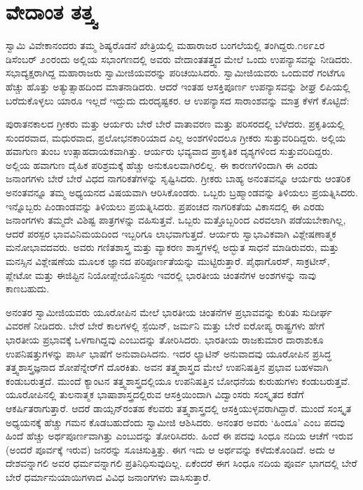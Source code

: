 
\chapter{ವೇದಾಂತ ತತ್ತ್ವ}

ಸ್ವಾಮಿ ವಿವೇಕಾನಂದರು ತಮ್ಮ ಶಿಷ್ಯರೊಡನೆ ಖೇತ್ರಿಯಲ್ಲಿ ಮಹಾರಾಜರ ಬಂಗಲೆಯಲ್ಲಿ ತಂಗಿದ್ದರು.೧೮೯೭ರ ಡಿಸೆಂಬರ್​ ೨೦ರಂದು ಅಲ್ಲಿಯ ಸಭಾಂಗಣದಲ್ಲಿ ಅವರು ವೇದಾಂತತತ್ತ್ವದ ಮೇಲೆ ಒಂದು ಉಪನ್ಯಾಸವನ್ನು ನೀಡಿದರು. ಸಭಾದ್ಯಕ್ಷರಾಗಿದ್ದ ಮಹಾರಾಜರು ಸ್ವಾಮೀಜಿಯವರನ್ನು ಪರಿಚಯಿಸಿದರು. ಸ್ವಾಮೀಜಿಯವರು ಒಂದುವರೆ ಗಂಟೆಗೂ ಹೆಚ್ಚು ಹೊತ್ತು ಅತ್ಯುತ್ಸಾಹದಿಂದ ಮಾತನಾಡಿದರು. ಆದರೆ ಇಂತಹ ಆಸಕ್ತಿಪೂರ್ಣ ಉಪನ್ಯಾಸವನ್ನು ಶೀಘ್ರ ಲಿಪಿಯಲ್ಲಿ ಬರೆದುಕೊಳ್ಳಲು ಯಾರೂ ಇಲ್ಲದೆ ಇದ್ದುದು ದುರದೃಷ್ಟಕರ. ಆ ಉಪನ್ಯಾಸದ ಸಾರಾಂಶವನ್ನು ಮಾತ್ರ ಕೆಳಗೆ ಕೊಟ್ಟಿದೆ:

ಪುರಾತನಕಾಲದ ಗ್ರೀಕರು ಮತ್ತು ಆರ್ಯರು ಬೇರೆ ಬೇರೆ ವಾತಾವರಣ ಮತ್ತು ಪರಿಸರದಲ್ಲಿ ಬೆಳೆದರು. ಪ್ರಕೃತಿಯಲ್ಲಿ ಸುಂದರವಾದ, ಮಧುರವಾದ, ಪ್ರಲೋಭನಕಾರಿಯಾದ ಎಲ್ಲ ಅಂಶಗಳಿಂದಲೂ ಗ್ರೀಕರು ಸುತ್ತುವರಿದಿದ್ದರು. ಅಲ್ಲಿಯ ಹವಾಗುಣ ತುಂಬ ಉತ್ಸಾಹದಾಯಕವಾಗಿತ್ತು. ಆರ್ಯರು ಭವ್ಯವಾದ ಪ್ರಾಕೃತಿಕ ದೃಶ್ಯಗಳಿಂದ ಸುತ್ತುವರಿದಿದ್ದರು. ಅಲ್ಲಿಯ ಹವಾಗುಣ ದೈಹಿಕ ಪರಿಶ್ರಮಕ್ಕೆ ಹೆಚ್ಚು ಅನುಕೂಲವಾಗಿರಲಿಲ್ಲ. ಈ ಕಾರಣಗಳಿಂದಾಗಿ ಈ ಎರಡು ಜನಾಂಗಗಳು ಬೇರೆ ಬೇರೆ ವಿಧದ ನಾಗರಿಕತೆಗಳನ್ನು ಸೃಷ್ಟಿಸಿದರು. ಗ್ರೀಕರು ಬಾಹ್ಯ ಅನಂತವನ್ನೂ ಆರ್ಯರು ಆಂತರಿಕ ಅನಂತವನ್ನೂ ತಮ್ಮ ಅಧ್ಯಯನದ ವಿಷಯವಾಗಿ ಆರಿಸಿಕೊಂಡರು. ಒಬ್ಬರು ಬ್ರಹ್ಮಾಂಡವನ್ನು ತಿಳಿಯಲು ಪ್ರಯತ್ನಿಸಿದರು. ಇನ್ನೊಬ್ಬರು ಪಿಂಡಾಂಡವನ್ನು ತಿಳಿಯಲು ಪ್ರಯತ್ನಿಸಿದರು. ಪ್ರಪಂಚದ ನಾಗರಿಕತೆಯ ವಿಕಾಸದಲ್ಲಿ ಈ ಎರಡು ಜನಾಂಗಗಳು ತಮ್ಮದೇ ವಿಶಿಷ್ಟ ಪಾತ್ರಗಳನ್ನು ವಹಿಸುತ್ತವೆ. ಒಬ್ಬರು ಮತ್ತೊಬ್ಬರಿಂದ ಎರವಲಾಗಿ ಪಡೆಯಬೇಕಾಗಿಲ್ಲ, ಆದರೆ ಪರಸ್ಪರ ಭಾವವಿನಿಮಯದಿಂದ ಇಬ್ಬರಿಗೂ ಲಾಭವಾಗುತ್ತದೆ. ಆರ್ಯರು ಸ್ವಾಭಾವಿಕವಾಗಿ ವಿಶ್ಲೇಷಣಾತ್ಮಕ ಮನೋಭಾವದವರು. ಅವರು ಗಣಿತಶಾಸ್ತ್ರ ಮತ್ತು ವ್ಯಾಕರಣ ಶಾಸ್ತ್ರಗಳಲ್ಲಿ ಅದ್ಭುತ ಸಾಧನೆ ಮಾಡಿರುವರು, ಮತ್ತು ಮನಸ್ಸಿನ ವಿಶ್ಲೇಷಣೆಯ ಮೂಲಕ ಜ್ಞಾನದ ಪರಿಪೂರ್ಣತೆಯನ್ನು ಮುಟ್ಟಿರುತ್ತಾರೆ. ಪೈಥಾಗೊರಸ್​, ಸಾಕ್ರಟೀಸ್​, ಪ್ಲೇಟೋ ಮತ್ತು ಈಜಿಪ್ಟಿನ ನಿಯೋಪ್ಲೇಯೊನಿಸ್ಟರು ಇವರಲ್ಲಿ ಭಾರತೀಯ ಚಿಂತನೆಗಳ ಅಂಶಗಳನ್ನು ನಾವು ಕಾಣಬಹುದು. 

ಅನಂತರ ಸ್ವಾಮೀಜಿಯವರು ಯೂರೋಪಿನ ಮೇಲೆ ಭಾರತೀಯ ಚಿಂತನೆಗಳ ಪ್ರಭಾವವನ್ನು ಕುರಿತು ಸುದೀರ್ಘ ವಿವರಣೆ ನೀಡಿದರು. ಬೇರೆ ಬೇರೆ ಕಾಲಗಳಲ್ಲಿ ಸ್ಪೆಯಿನ್​, ಜರ್ಮನಿ ಮತ್ತು ಬೇರೆ ಐರೋಪ್ಯ ರಾಷ್ಟ್ರಗಳು ಹೇಗೆ ಭಾರತೀಯ ಪ್ರಭಾವಕ್ಕೆ ಒಳಗಾಗಿದ್ದವು ಎಂಬುದನ್ನು ತೋರಿಸಿದರು. ಭಾರತೀಯ ರಾಜಕುಮಾರ ದಾರಾಶುಕೂ ಉಪನಿಷತ್ತುಗಳನ್ನು ಪಾರ್ಸಿ ಭಾಷೆಗೆ ಅನುವಾದಿಸಿದನು. ಇದರ ಲ್ಯಾಟಿನ್​ ಅನುವಾದವು ಯೂರೋಪಿನ ಪ್ರಸಿದ್ಧ ತತ್ತ್ವಶಾಸ್ತ್ರಜ್ಞನಾದ ಶೋಪೆನ್ನೇರ್​ಗೆ ದೊರಕಿತು. ಅವನ ತತ್ತ್ವಶಾಸ್ತ್ರದ ಮೇಲೆ ಉಪನಿಷತ್ತಿನ ಪ್ರಭಾವ ಬಹಳವಾಗಿ ಕಂಡುಬರುತ್ತದೆ. ಮುಂದೆ ಕ್ಯಾಂಟನ ತತ್ತ್ವಶಾಸ್ತ್ರದಲ್ಲಿಯೂ ಉಪನಿಷತ್ತಿನ ಬೋಧನೆಯ ಕುರುಹುಗಳು ಕಂಡುಬರುತ್ತವೆ. ಯೂರೋಪಿನಲ್ಲಿ ತುಲನಾತ್ಮಕ ಭಾಷಾಶಾಸ್ತ್ರದಲ್ಲಿರುವ ಆಸಕ್ತಿಯಿಂದಾಗಿ ವಿದ್ವಾಂಸರು ಸಂಸ್ಕೃತದ ಕಡೆಗೆ ಆಕರ್ಷಿತರಾಗುತ್ತಾರೆ. ಆದರೆ ಡಾಯ್ಸನ್​ರಂತಹ ಕೆಲವರು ತತ್ತ್ವಶಾಸ್ತ್ರದಲ್ಲಿ ಆಸಕ್ತಿಯುಳ್ಳವರಾಗಿದ್ದಾರೆ. ಮುಂದೆ ಸಂಸ್ಕೃತ ಅಧ್ಯಯನಕ್ಕೆ ಹೆಚ್ಚು ಗಮನ ಕೊಡಬಹುದೆಂದು ಸ್ವಾಮೀಜಿ ಆಶಿಸಿದರು. ಅನಂತರ ಅವರು ‘ಹಿಂದೂ’ ಎಂಬ ಪದವು ಹಿಂದೆ ಹೆಚ್ಚು ಅರ್ಥಪೂರ್ಣವಾಗಿತ್ತು ಎಂಬುದನ್ನು ತೋರಿಸಿದರು. ಹಿಂದೆ ಈ ಪದವು ಸಿಂಧೂ ನದಿಯ ಆಚೆಗೆ ಇರುವ (ಅಂದರೆ ಪೂರ್ವಕ್ಕೆ ಇರುವ) ಜನರನ್ನು ಸೂಚಿಸುತ್ತಿತ್ತು. ಈಗ ಇದು ಆ ಅರ್ಥವನ್ನು ಕಳೆದುಕೊಂಡಿದೆ. ಅದು ಆ ದೇಶವನ್ನಾಗಲಿ ಅವರ ಧರ್ಮವನ್ನಾಗಲಿ ಪ್ರತಿನಿಧಿಸುವುದಿಲ್ಲ. ಏಕೆಂದರೆ ಈಗ ಸಿಂಧೂ ನದಿಯ ಪೂರ್ವ ಭಾಗದಲ್ಲಿ ಬೇರೆ ಬೇರೆ ಧರ್ಮಾನುಯಾಯಿಗಳಾದ ವಿವಿಧ ಜನಾಂಗಗಳು ವಾಸಿಸುತ್ತಾರೆ. 

